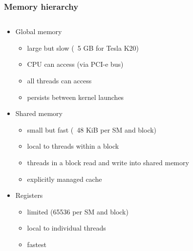 \begin{frame}
\frametitle{Memory hierarchy}
\begin{columns}
\begin{column}{0.5\textwidth}
\begin{itemize}
\item Global memory{
\begin{itemize}
    \item large but slow (~5 GB for Tesla K20)
    \item CPU can access (via PCI-e bus)
    \item all threads can access
    \item persists between kernel launches
\end{itemize}}
\item Shared memory{
\begin{itemize}
    \item small but fast (~48 KiB per SM and block)
    \item local to threads within a block
    \item threads in a block read and write into shared memory
    \item explicitly managed cache
\end{itemize}}
\item Registers{
\begin{itemize}
    \item limited (65536 per SM and block)
    \item local to individual threads
    \item fastest
\end{itemize}}
\end{itemize}
\end{column}
\begin{column}{0.5\textwidth}
\end{column}
\end{columns}
\end{frame}

